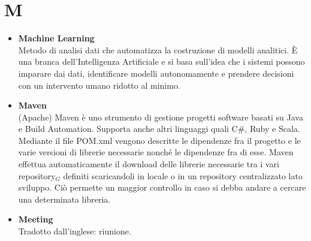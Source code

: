 \chapter{M} \label{M}
\begin{itemize}
	\item \textbf{Machine Learning} \\
	Metodo di analisi dati che automatizza la costruzione di modelli analitici. È una branca dell'Intelligenza Artificiale e si basa sull'idea che i sistemi possono imparare dai dati, identificare modelli autonomamente e prendere decisioni con un intervento umano ridotto al minimo.

	\item \textbf{Maven} \\
	(Apache) Maven è uno strumento di gestione progetti software basati su Java e Build Automation.
	Supporta anche altri linguaggi quali C\#, Ruby e Scala.
	Mediante il file POM.xml vengono descritte le dipendenze fra il progetto e le varie versioni di librerie necessarie nonché le dipendenze fra di esse.
	Maven effettua automaticamente il download delle librerie necessarie tra i vari repository$_G$ definiti scaricandoli in locale o in un repository centralizzato lato sviluppo.
	Ciò permette un maggior controllo in caso si debba andare a cercare una determinata libreria.

	\item \textbf{Meeting}\\
	Tradotto dall’inglese: riunione.
\end{itemize}
